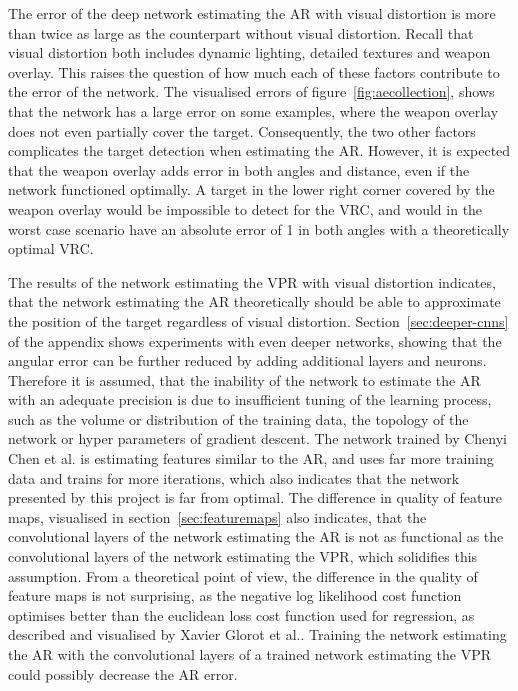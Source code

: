 The error of the deep network estimating the AR with visual distortion is more than twice as large as the counterpart without visual distortion. Recall that visual distortion both includes dynamic lighting, detailed textures and weapon overlay. This raises the question of how much each of these factors contribute to the error of the network. The visualised errors of figure~\ref{fig:aecollection}, shows that the network has a large error on some examples, where the weapon overlay does not even partially cover the target. Consequently, the two other factors complicates the target detection when estimating the AR. However, it is expected that the weapon overlay adds error in both angles and distance, even if the network functioned optimally. A target in the lower right corner covered by the weapon overlay would be impossible to detect for the VRC, and would in the worst case scenario have an absolute error of 1 in both angles with a theoretically optimal VRC.

The results of the network estimating the VPR with visual distortion indicates, that the network estimating the AR theoretically should be able to approximate the position of the target regardless of visual distortion. Section~\ref{sec:deeper-cnns} of the appendix shows experiments with even deeper networks, showing that the angular error can be further reduced by adding additional layers and neurons. Therefore it is assumed, that the inability of the network to estimate the AR with an adequate precision is due to insufficient tuning of the learning process, such as the volume or distribution of the training data, the topology of the network or hyper parameters of gradient descent. The network trained by Chenyi Chen et al.\cite{chen} is estimating features similar to the AR, and uses far more training data and trains for more iterations, which also indicates that the network presented by this project is far from optimal. The difference in quality of feature maps, visualised in section~\ref{sec:featuremaps} also indicates, that the convolutional layers of the network estimating the AR is not as functional as the convolutional layers of the network estimating the VPR, which solidifies this assumption. From a theoretical point of view, the difference in the quality of feature maps is not surprising, as the negative log likelihood cost function optimises better than the euclidean loss cost function used for regression, as described and visualised by Xavier Glorot et al.\cite{DBLP:journals/jmlr/GlorotB10}. Training the network estimating the AR with the convolutional layers of a trained network estimating the VPR could possibly decrease the AR error.


